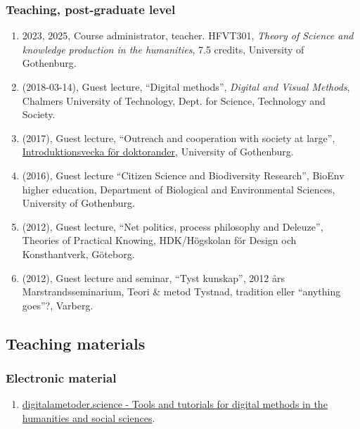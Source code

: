 \documentclass[
]{article}
\providecommand{\tightlist}{%
  \setlength{\itemsep}{0pt}\setlength{\parskip}{0pt}}
\begin{document}
\hypertarget{teaching-post-graduate-level}{%
\subsubsection{Teaching, post-graduate
level}\label{teaching-post-graduate-level}}

\begin{enumerate}
\def\labelenumi{\arabic{enumi}.}
\tightlist
\item
  2023, 2025, Course administrator, teacher. HFVT301, \emph{Theory of
  Science and knowledge production in the humanities}, 7.5 credits,
  University of Gothenburg.
\item
  (2018-03-14), Guest lecture, ``Digital methods'', \emph{Digital and
  Visual Methods}, Chalmers University of Technology, Dept. for Science,
  Technology and Society.
\item
  (2017), Guest lecture, ``Outreach and cooperation with society at
  large'',
  \href{http://hum.gu.se/utbildning/forskarniva/introduktionsvecka-for-doktorander-2017}{Introduktionsvecka
  för doktorander}, University of Gothenburg.
\item
  (2016), Guest lecture ``Citizen Science and Biodiversity Research'',
  BioEnv higher education, Department of Biological and Environmental
  Sciences, University of Gothenburg.
\item
  (2012), Guest lecture, ``Net politics, process philosophy and
  Deleuze'', Theories of Practical Knowing, HDK/Högskolan för Design och
  Konsthantverk, Göteborg.
\item
  (2012), Guest lecture and seminar, ``Tyst kunskap'', 2012 års
  Marstrandsseminarium, Teori \& metod Tystnad, tradition eller
  ``anything goes''?, Varberg.
\end{enumerate}

\hypertarget{teaching-materials}{%
\subsection{Teaching materials}\label{teaching-materials}}

\hypertarget{electronic-material}{%
\subsubsection{Electronic material}\label{electronic-material}}

\begin{enumerate}
\def\labelenumi{\arabic{enumi}.}
\tightlist
\item
  \href{http://digitalametoder.science}{digitalametoder.science - Tools
  and tutorials for digital methods in the humanities and social
  sciences}.
\end{enumerate}
\end{document}
